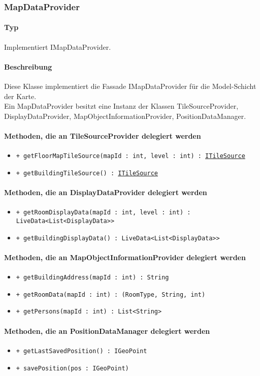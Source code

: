 \subsubsection{MapDataProvider}
\paragraph*{Typ}
Implementiert IMapDataProvider.
\paragraph*{Beschreibung}
Diese Klasse implementiert die Fassade IMapDataProvider für die Model-Schicht der Karte.\\
Ein MapDataProvider besitzt eine Instanz der Klassen 
TileSourceProvider, DisplayDataProvider, MapObjectInformationProvider, PositionDataManager.

\paragraph*{Methoden, die an TileSourceProvider delegiert werden}
\begin{itemize}
    \item \texttt{+ getFloorMapTileSource(mapId : int, level : int) : \href{https://osmdroid.github.io/osmdroid/javadocAll/org/osmdroid/tileprovider/tilesource/ITileSource.html}{ITileSource}}
    \item \texttt{+ getBuildingTileSource() : \href{https://osmdroid.github.io/osmdroid/javadocAll/org/osmdroid/tileprovider/tilesource/ITileSource.html}{ITileSource}}
\end{itemize}

\paragraph*{Methoden, die an DisplayDataProvider delegiert werden}
\begin{itemize}
    \item \texttt{+ getRoomDisplayData(mapId : int, level : int) : LiveData<List<DisplayData>>}
    \item \texttt{+ getBuildingDisplayData() : LiveData<List<DisplayData>>}
\end{itemize}

\paragraph*{Methoden, die an MapObjectInformationProvider delegiert werden}
\begin{itemize}
    \item \texttt{+ getBuildingAddress(mapId : int) : String}
    \item \texttt{+ getRoomData(mapId : int) : (RoomType, String, int)}
    \item \texttt{+ getPersons(mapId : int) : List<String>}
\end{itemize}

\paragraph*{Methoden, die an PositionDataManager delegiert werden}
\begin{itemize}
    \item \texttt{+ getLastSavedPosition() : IGeoPoint}
    \item \texttt{+ savePosition(pos : IGeoPoint)}
\end{itemize}
